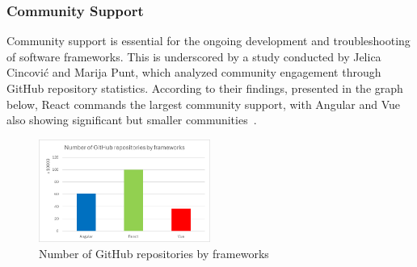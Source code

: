 \documentclass[conference]{IEEEtran}
\begin{document}
\subsubsection{Community Support}
Community support is essential for the ongoing development and troubleshooting of software frameworks. This is underscored by a study conducted by Jelica Cincović and Marija Punt, which analyzed community engagement through GitHub repository statistics. According to their findings, presented in the graph below, React commands the largest community support, with Angular and Vue also showing significant but smaller communities~\cite{cincovic2020comparison}.

\begin{figure}[h!]
    \centering
    \includegraphics[width=0.5\textwidth]{image.png}
    \caption{Number of GitHub repositories by frameworks~\cite{cincovic2020comparison}}
    \label{fig:github_repos}
\end{figure}
    


\end{document}
